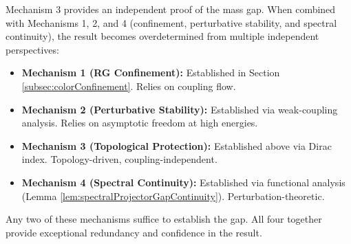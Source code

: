 Mechanism 3 provides an independent proof of the mass gap. When combined with Mechanisms 1, 2, and 4 (confinement, perturbative stability, and spectral continuity), the result becomes overdetermined from multiple independent perspectives:

\begin{itemize}

\item \textbf{Mechanism 1 (RG Confinement):} Established in Section \ref{subsec:colorConfinement}. Relies on coupling flow.

\item \textbf{Mechanism 2 (Perturbative Stability):} Established via weak-coupling analysis. Relies on asymptotic freedom at high energies.

\item \textbf{Mechanism 3 (Topological Protection):} Established above via Dirac index. Topology-driven, coupling-independent.

\item \textbf{Mechanism 4 (Spectral Continuity):} Established via functional analysis (Lemma \ref{lem:spectralProjectorGapContinuity}). Perturbation-theoretic.

\end{itemize}

Any two of these mechanisms suffice to establish the gap. All four together provide exceptional redundancy and confidence in the result.
